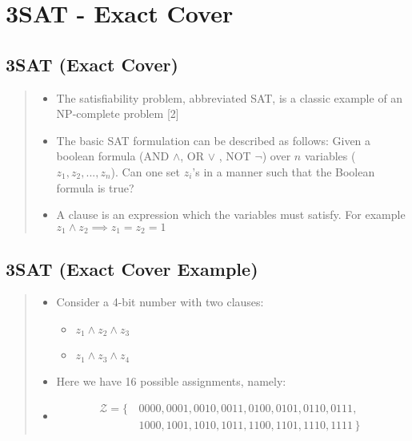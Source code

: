 \documentclass[
]{article}
\providecommand{\tightlist}{%
  \setlength{\itemsep}{0pt}\setlength{\parskip}{0pt}}
\begin{document}
\hypertarget{sat---exact-cover}{%
\section{3SAT - Exact Cover}\label{sat---exact-cover}}

\hypertarget{sat-exact-cover}{%
\subsection{3SAT (Exact Cover)}\label{sat-exact-cover}}

\begin{quote}
\begin{itemize}
\tightlist
\item
  The satisfiability problem, abbreviated SAT, is a classic example of
  an NP-complete problem {[}2{]}
\item
  The basic SAT formulation can be described as follows: Given a boolean
  formula (AND \(\land\), OR \(\lor\) , NOT \(\neg\)) over \(n\)
  variables (\(z_1, z_2, ... , z_n\)). Can one set \(z_i\)'s in a manner
  such that the Boolean formula is true?
\item
  A clause is an expression which the variables must satisfy. For
  example \(z_1 \land z_2 \implies z_1 = z_2 = 1\)
\end{itemize}
\end{quote}

\hypertarget{sat-exact-cover-example}{%
\subsection{3SAT (Exact Cover Example)}\label{sat-exact-cover-example}}

\begin{quote}
\begin{itemize}
\tightlist
\item
  Consider a 4-bit number with two clauses:

  \begin{itemize}
  \tightlist
  \item
    \(z_1 \land z_2 \land z_3\)
  \item
    \(z_1 \land z_3 \land z_4\)
  \end{itemize}
\item
  Here we have 16 possible assignments, namely:
\item
  \begin{align*}
  \mathcal{Z} = \{\,
  & 0000, 0001, 0010, 0011, 0100, 0101, 0110, 0111, \\
  & 1000, 1001, 1010, 1011, 1100, 1101, 1110, 1111 \,\}\enspace
  \end{align*}
\end{itemize}
\end{quote}
\end{document}
